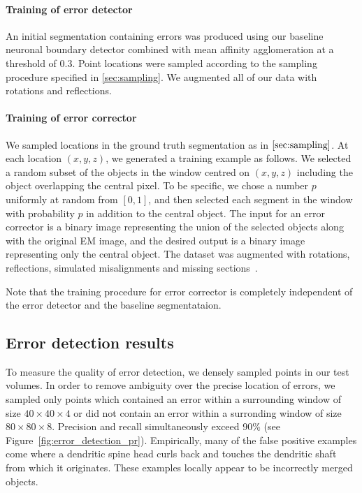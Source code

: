 \documentclass{article}
\begin{document}
\paragraph{Training of error detector}
An initial segmentation containing errors was produced using our baseline neuronal boundary detector combined with mean affinity agglomeration at a threshold of 0.3. Point locations were sampled according to the sampling procedure specified in \ref{sec:sampling}. We augmented all of our data with rotations and reflections.

\paragraph{Training of error corrector}
We sampled locations in the ground truth segmentation as in $\ref{sec:sampling}$. At each location $(x,y,z)$, we generated a training example as follows. We selected a random subset of the objects in the window centred on $(x,y,z)$ including the object overlapping the central pixel. To be specific, we chose a number $p$ uniformly at random from $[0,1]$, and then selected each segment in the window with probability $p$ in addition to the central object. The input for an error corrector is a binary image representing the union of the selected objects along with the original EM image, and the desired output is a binary image representing only the central object. The dataset was augmented with rotations, reflections, simulated misalignments and missing sections~\cite{kisuk}.

Note that the training procedure for error corrector is completely independent of the error detector and the baseline segmentataion.


\subsection{Error detection results}
To measure the quality of error detection, we densely sampled points in our test volumes. In order to remove ambiguity over the precise location of errors, we sampled only points which contained an error within a surrounding window of size $40\times 40 \times 4$ or did not contain an error within a surronding window of size $80 \times 80 \times 8$. Precision and recall simultaneously exceed 90\% (see Figure~\ref{fig:error_detection_pr}). Empirically, many of the false positive examples come where a dendritic spine head curls back and touches the dendritic shaft from which it originates. These examples locally appear to be incorrectly merged objects.
\end{document}
